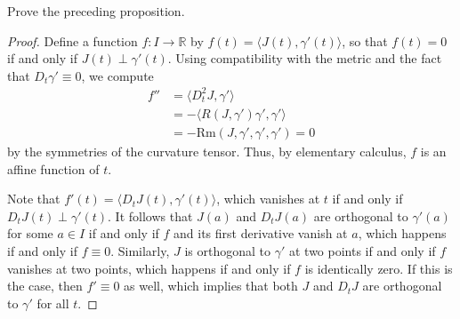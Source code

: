 \begin{exercise}
\label{exer:prove-local-isometry-invariance}

Prove the preceding proposition.
\end{exercise}
\begin{proof}
Define a function $f: I \to \mathbb{R}$ by $f(t) = \langle J(t), \gamma'(t) \rangle$, so that $f(t) = 0$ if and only if $J(t) \perp \gamma'(t)$. Using compatibility with the metric and the fact that $D_t \gamma' \equiv 0$, we compute
\begin{align*}
f'' &= \langle D_t^2 J, \gamma' \rangle \\
&= -\langle R(J, \gamma') \gamma', \gamma' \rangle \\
&= -\mathrm{Rm}(J, \gamma', \gamma', \gamma') = 0
\end{align*}
by the symmetries of the curvature tensor. Thus, by elementary calculus, $f$ is an affine function of $t$.

Note that $f'(t) = \langle D_t J(t), \gamma'(t) \rangle$, which vanishes at $t$ if and only if $D_t J(t) \perp \gamma'(t)$. It follows that $J(a)$ and $D_t J(a)$ are orthogonal to $\gamma'(a)$ for some $a \in I$ if and only if $f$ and its first derivative vanish at $a$, which happens if and only if $f \equiv 0$. Similarly, $J$ is orthogonal to $\gamma'$ at two points if and only if $f$ vanishes at two points, which happens if and only if $f$ is identically zero. If this is the case, then $f' \equiv 0$ as well, which implies that both $J$ and $D_t J$ are orthogonal to $\gamma'$ for all $t$.
\end{proof}

